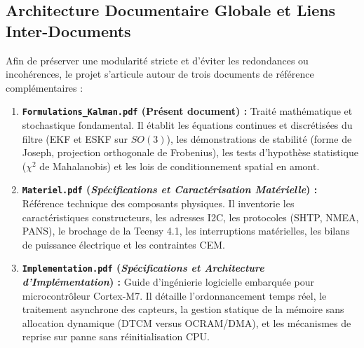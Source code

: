\documentclass[../Formulations_Kalman.tex]{subfiles}
\begin{document}
\subsection{Architecture Documentaire Globale et Liens Inter-Documents}
Afin de préserver une modularité stricte et d'éviter les redondances ou incohérences, le projet s'articule autour de trois documents de référence complémentaires :
\begin{enumerate}
    \item \textbf{\texttt{Formulations\_Kalman.pdf} (Présent document) :} Traité mathématique et stochastique fondamental. Il établit les équations continues et discrétisées du filtre (EKF et ESKF sur $SO(3)$), les démonstrations de stabilité (forme de Joseph, projection orthogonale de Frobenius), les tests d'hypothèse statistique ($\chi^2$ de Mahalanobis) et les lois de conditionnement spatial en amont.
    \item \textbf{\texttt{Materiel.pdf} (\textit{Spécifications et Caractérisation Matérielle}) :} Référence technique des composants physiques. Il inventorie les caractéristiques constructeurs, les adresses I2C, les protocoles (SHTP, NMEA, PANS), le brochage de la Teensy 4.1, les interruptions matérielles, les bilans de puissance électrique et les contraintes CEM.
    \item \textbf{\texttt{Implementation.pdf} (\textit{Spécifications et Architecture d'Implémentation}) :} Guide d'ingénierie logicielle embarquée pour microcontrôleur Cortex-M7. Il détaille l'ordonnancement temps réel, le traitement asynchrone des capteurs, la gestion statique de la mémoire sans allocation dynamique (DTCM versus OCRAM/DMA), et les mécanismes de reprise sur panne sans réinitialisation CPU.
\end{enumerate}
\end{document}
